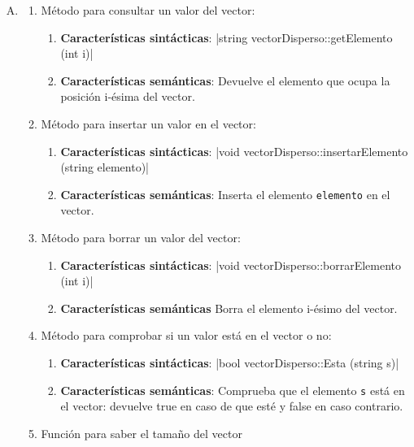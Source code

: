 \documentclass[10pt,a4paper,spanish]{report}
\begin{document}
\begin{enumerate}[A.]
      \item
      \begin{enumerate}[1.]
      \item Método para consultar un valor del vector:
      \begin{enumerate}[---]
            \item \textbf{\textcolor[rgb]{0.5,0.8,1}{Características sintácticas}}: |string vectorDisperso::getElemento (int i)|
            \item \textbf{\textcolor[rgb]{0.5,0.8,1}{Características semánticas}}: Devuelve el elemento que ocupa la posición i-ésima del vector.
      \end{enumerate}
      \item Método para insertar un valor en el vector:
      \begin{enumerate}[---]
            \item \textbf{\textcolor[rgb]{0.5,0.8,1}{Características sintácticas}}: |void vectorDisperso::insertarElemento (string elemento)|
            \item \textbf{\textcolor[rgb]{0.5,0.8,1}{Características semánticas}}: Inserta el elemento \verb*|elemento| en el vector.
      \end{enumerate}
      \item Método para borrar un valor del vector:
      \begin{enumerate}[---]
            \item \textbf{\textcolor[rgb]{0.5,0.8,1}{Características sintácticas}}: |void vectorDisperso::borrarElemento (int i)|
            \item \textbf{\textcolor[rgb]{0.5,0.8,1}{Características semánticas}} Borra el elemento i-ésimo del vector.
      \end{enumerate}
      \item Método para comprobar si un valor está en el vector o no:
      \begin{enumerate}
            \item \textbf{\textcolor[rgb]{0.5,0.8,1}{Características sintácticas}}: |bool vectorDisperso::Esta (string s)|
            \item \textbf{\textcolor[rgb]{0.5,0.8,1}{Características semánticas}}: Comprueba que el elemento \verb*|s| está en el vector: devuelve true en caso de que esté y false en caso contrario.
      \end{enumerate}
      \item Función para saber el tamaño del vector

\end{enumerate}
\end{enumerate}
\end{document}
